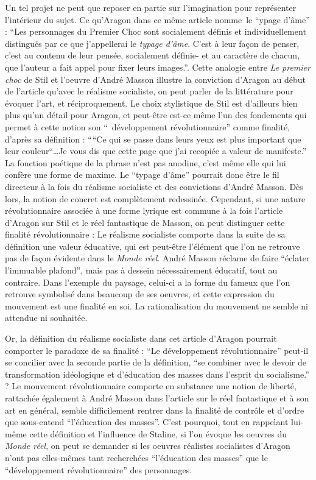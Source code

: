 	Un tel projet ne peut que reposer en partie sur l’imagination pour représenter l’intérieur du sujet. Ce qu’Aragon dans ce même article nomme le \enquote{ypage d’âme} : \enquote{Les personnages du Premier Choc sont socialement définis et individuellement distingués par ce que j’appellerai le \emph{typage d’âme}. C’est à leur façon de penser, c’est au contenu de leur pensée, socialement définie- et au caractère de chacun, que l’auteur a fait appel pour fixer leurs images.}. Cette analogie entre \emph{Le premier choc} de Stil et l’oeuvre d’André Masson illustre la conviction d’Aragon au début de l’article qu’avec le réalisme socialiste, on peut parler de la littérature pour évoquer l’art, et réciproquement.  Le choix stylistique de Stil est d’ailleurs bien plus qu’un détail pour Aragon, et peut-être est-ce même l’un des fondements qui permet à cette notion son \enquote{ développement révolutionnaire} comme finalité, d’après sa définition : \enquote{“Ce qui se passe dans leurs yeux est plus important que leur couleur“…Je vous dis que cette page que j’ai recopiée a valeur de manifeste.} La fonction poétique de la phrase n’est pas anodine, c’est même elle qui lui confère une forme de maxime. Le \enquote{typage d’âme} pourrait donc être le fil directeur à la fois du réalisme socialiste et des convictions d’André Masson. Dès lors, la notion de concret est complètement redessinée. Cependant, si une nature révolutionnaire associée à une forme lyrique est commune à la fois l’article d’Aragon sur Stil et le réel fantastique de Masson, on peut distinguer cette finalité révolutionnaire : Le réalisme socialiste comporte dans la suite de sa définition une valeur éducative, qui est peut-être l’élément que l’on ne retrouve pas de façon évidente dans le \emph{Monde réel}. André Masson réclame de faire \enquote{éclater l’immuable plafond}, mais pas à dessein nécessairement éducatif, tout au contraire. Dans l’exemple du paysage, celui-ci a la forme du fameux que l’on retrouve symbolisé dans beaucoup de ses oeuvres, et cette expression du mouvement est une finalité en soi. La rationalisation du mouvement ne semble ni attendue ni souhaitée. 


Or, la définition du réalisme socialiste dans cet article d’Aragon pourrait comporter le paradoxe de sa finalité : \enquote{Le développement révolutionnaire} peut-il se concilier avec la seconde partie de la définition, \enquote{se combiner avec le devoir de transformation idéologique et d’éducation des masses dans l’esprit du socialisme.} ? Le mouvement révolutionnaire comporte en substance une notion de liberté, rattachée également à André Masson dans l’article sur le réel fantastique et à son art en général, semble difficilement rentrer dans la finalité de contrôle et d’ordre que sous-entend \enquote{l’éducation des masses}. C’est pourquoi, tout en rappelant lui-même cette définition et l’influence de Staline, si l’on évoque les oeuvres du \emph{Monde réel}, on peut se demander si les oeuvres réalistes socialistes d’Aragon n’ont pas elles-mêmes tant recherchées \enquote{l’éducation des masses} que le \enquote{développement révolutionnaire} des personnages. 

